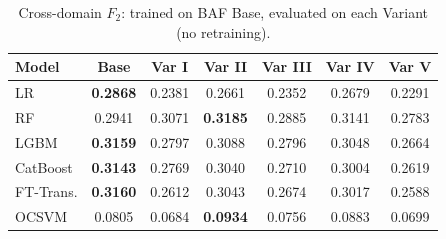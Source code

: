\begin{table}[H]
\centering
\caption{Cross-domain $F_2$: trained on BAF Base, evaluated on each Variant (no retraining).}
\label{tab:crossdomain_f2}
\begin{tabular}{l c c c c c c}
\toprule
Model & Base & Var I & Var II & Var III & Var IV & Var V \\
\midrule
LR         & \textbf{0.2868} & 0.2381 & 0.2661 & 0.2352 & 0.2679 & 0.2291 \\
RF         & 0.2941 & 0.3071 & \textbf{0.3185} & 0.2885 & 0.3141 & 0.2783 \\
LGBM       & \textbf{0.3159} & 0.2797 & 0.3088 & 0.2796 & 0.3048 & 0.2664 \\
CatBoost   & \textbf{0.3143} & 0.2769 & 0.3040 & 0.2710 & 0.3004 & 0.2619 \\
FT-Trans.  & \textbf{0.3160} & 0.2612 & 0.3043 & 0.2674 & 0.3017 & 0.2588 \\
OCSVM      & 0.0805 & 0.0684 & \textbf{0.0934} & 0.0756 & 0.0883 & 0.0699 \\
\bottomrule
\end{tabular}
\end{table}